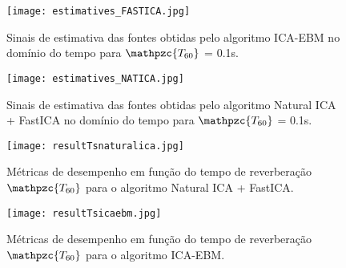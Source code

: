     \begin{figure}
        \centering
        \texttt{[image: estimatives\_FASTICA.jpg]}
        \caption{Sinais de estimativa das fontes obtidas pelo algoritmo ICA-EBM no domínio do tempo para $\mathpzc{T_{60}}$ = 0.1s.}
        \label{fig:icaebm}
        \texttt{[image: estimatives\_NATICA.jpg]}
        \caption{Sinais de estimativa das fontes obtidas pelo algoritmo Natural ICA + FastICA  no domínio do tempo para $\mathpzc{T_{60}}$ = 0.1s.}
        \label{fig:natica}
    \end{figure}
    
    
    \begin{figure}
        \centering
        \texttt{[image: resultTsnaturalica.jpg]}
        \caption{Métricas de desempenho em função do tempo de reverberação $\mathpzc{T_{60}}$ para o algoritmo Natural ICA + FastICA.}
        \label{fig:T60natica}
         \texttt{[image: resultTsicaebm.jpg]}
        \caption{Métricas de desempenho em função do tempo de reverberação $\mathpzc{T_{60}}$ para o algoritmo ICA-EBM.}
        \label{fig:T60icaebm}
    \end{figure}
    